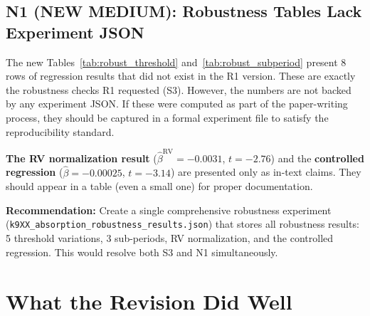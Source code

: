 \documentclass[12pt,a4paper]{article}
\begin{document}
\subsection*{\textcolor{warncolor}{N1 (NEW MEDIUM): Robustness Tables Lack Experiment JSON}}

The new Tables~\ref{tab:robust_threshold} and~\ref{tab:robust_subperiod} present 8 rows of regression results that did not exist in the R1 version. These are exactly the robustness checks R1 requested (S3). However, the numbers are not backed by any experiment JSON. If these were computed as part of the paper-writing process, they should be captured in a formal experiment file to satisfy the reproducibility standard.

\textbf{The RV normalization result} ($\hat{\beta}^{\text{RV}} = -0.0031$, $t = -2.76$) and the \textbf{controlled regression} ($\hat{\beta} = -0.00025$, $t = -3.14$) are presented only as in-text claims. They should appear in a table (even a small one) for proper documentation.

\textbf{Recommendation:} Create a single comprehensive robustness experiment (\texttt{k9XX\_absorption\_robustness\_results.json}) that stores all robustness results: 5 threshold variations, 3 sub-periods, RV normalization, and the controlled regression. This would resolve both S3 and N1 simultaneously.


\bigskip

\section*{What the Revision Did Well}
\end{document}
